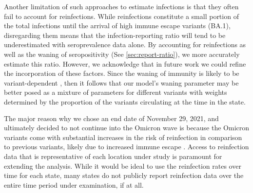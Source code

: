 Another limitation of such approaches to estimate infections 
is that they often fail to account for reinfections. While reinfections constitute a small
portion of the total infections until the arrival of high immune escape variants (BA.1), 
disregarding them means
that the infection-reporting ratio will tend to be underestimated with
seroprevalence data alone. By accounting for reinfections as well as the waning of
seropositivity (See \autoref{sec:report-ratio}), we more accurately estimate
this ratio.
However, we acknowledge that in future work we could refine the incorporation of these
factors. Since the waning of immunity is likely to
be variant-dependent \citep{pooley2023durability}, then it follows that our model's
waning parameter may be better posed as a mixture of parameters for different
variants with weights determined by the proportion of the variants circulating
at the time in the state. 

The major reason why we chose an end date of November 29,
2021, and ultimately decided to not continue into the Omicron wave is because
the Omicron variants come with substantial increases in the risk of reinfection
in comparison to previous variants, likely due to increased immune escape
\citep{wei2024risk, pulliam2022increased, eythorsson2022rate}. Access to
reinfection data that is representative of each location under study is paramount
for extending the analysis. While it would be ideal to use the reinfection rates
over time for each \US state, many states do not publicly report reinfection
data over the entire time period under examination, if at all.



